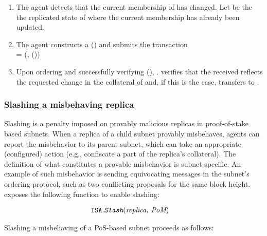 \begin{enumerate}
    \item The \ipc agent detects that the current membership of  has changed.
    Let  be the the replicated state of  where the current membership has already been updated.

    \item The \ipc agent constructs a {\pof}() and submits the transaction\\
     = (, {\pof}())

    \item Upon ordering  and successfully verifying {\pof}(),
    . verifies that the received  reflects the requested change in the collateral of 
    and, if this is the case, transfers  to .
    
\end{enumerate}

\subsubsection{Slashing a misbehaving replica}
\label{sec:slash}
Slashing is a penalty imposed on provably malicious replicas in proof-of-stake based subnets.
When a replica of a child subnet provably misbehaves, \ipc agents can report the misbehavior to its parent subnet,
which can take an appropriate (configured) action (e.g., confiscate a part of the replica's collateral).
The definition of what constitutes a provable misbehavior is subnet-specific.
An example of such misbehavior is sending equivocating messages in the subnet's ordering protocol, such as two conflicting proposals for the same block height.
\ipc exposes the following function to enable slashing:

\begin{align*}
    \texttt{ISA}.&\textit{\texttt{Slash}}(\textit{replica, PoM})
\end{align*}

Slashing a misbehaving  of a PoS-based subnet  proceeds as follows:

